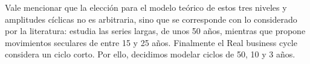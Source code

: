 \documentclass[a4paper]{article}
\begin{document}
Vale mencionar que la elección para el modelo teórico de estos tres niveles y amplitudes cíclicas no es arbitraria, sino que se corresponde con lo considerado por la literatura: \cite{kondratieff1979long} estudia las series largas, de unos 50 años, mientras que \cite{kuznets1930secular} propone movimientos seculares de entre 15 y 25 años. Finalmente el Real business cycle \citep{kydland1982time} considera un ciclo corto. Por ello, decidimos modelar ciclos de 50, 10 y 3 años. 

\begin{figure}[H]
	\centering

\end{figure}
\end{document}
